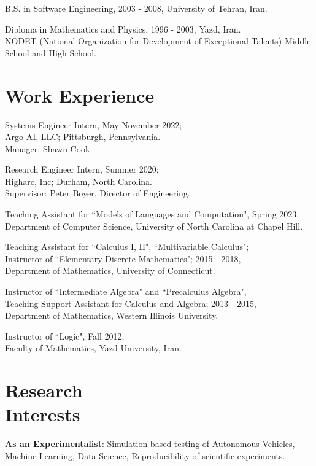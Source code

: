 \documentclass[margin]{res}
\begin{document}
\begin{resume}
B.S. in Software Engineering, 2003 - 2008, University of Tehran, Iran.

Diploma in Mathematics and Physics, 1996 - 2003, Yazd, Iran. \\
{\scriptsize NODET (National Organization for Development of Exceptional Talents) Middle School and High School.}



\section{Work Experience}
Systems Engineer Intern, May-November 2022; \\
Argo AI, LLC; Pittsburgh, Pennsylvania. \\
{\scriptsize Manager: Shawn Cook.}

Research Engineer Intern, Summer 2020; \\
Higharc, Inc; Durham, North Carolina. \\
{\scriptsize Supervisor: Peter Boyer, Director of Engineering.}

Teaching Assistant for ``Models of Languages and Computation", Spring 2023,\\
Department of Computer Science, University of North Carolina at Chapel Hill.

Teaching Assistant for ``Calculus I, II", ``Multivariable Calculus"; \\
Instructor of ``Elementary Discrete Mathematics"; 2015 - 2018,\\
Department of Mathematics, University of Connecticut.

Instructor of ``Intermediate Algebra" and ``Precalculus Algebra",\\
Teaching Support Assistant for Calculus and Algebra; 2013 - 2015,\\
Department of Mathematics, Western Illinois University.

Instructor of ``Logic", Fall 2012, \\
Faculty of Mathematics, Yazd University, Iran.



\section{Research \\ Interests}
\textbf{As an Experimentalist}:
Simulation-based testing of Autonomous Vehicles,\\
Machine Learning, Data Science, Reproducibility of scientific experiments.



\end{resume}
\end{document}

